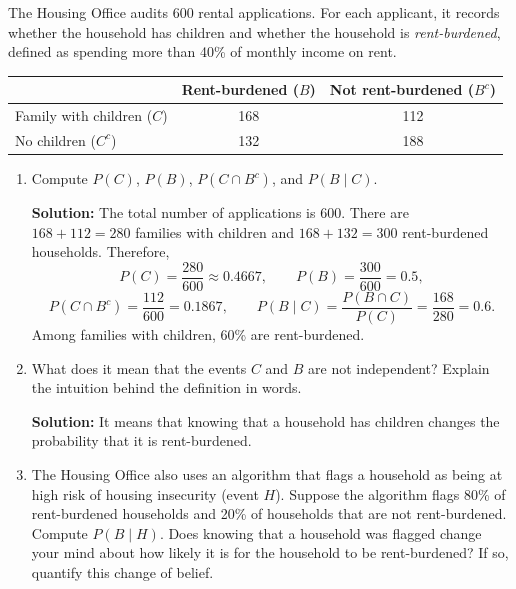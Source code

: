 \documentclass[11pt]{exam}
\begin{document}
\begin{questions}

\newpage
\question[2.5]
The Housing Office audits 600 rental applications. For each applicant, it records whether the household has children and whether the household is \textit{rent-burdened}, defined as spending more than 40\% of monthly income on rent.

\begin{center}
\begin{tabular}{lcc}
\toprule
 & Rent-burdened ($B$) & Not rent-burdened ($B^c$) \\
\midrule
Family with children ($C$) & 168 & 112 \\
No children ($C^c$)       & 132 & 188 \\
\bottomrule
\end{tabular}
\end{center}

\begin{enumerate}[leftmargin = 0.5cm, label = (\alph*), rightmargin = 0.2cm]
    \item Compute $P(C)$, $P(B)$, $P(C\cap B^c)$, and $P(B\mid C)$.

    \begin{solutionorbox}[7.9cm]
    \textbf{Solution:} The total number of applications is 600. There are $168+112=280$ families with children and $168+132=300$ rent-burdened households. Therefore,
    \[
    P(C)=\frac{280}{600}\approx 0.4667, \qquad
    P(B)=\frac{300}{600}=0.5,
    \]
    \[
    P(C\cap B^c)=\frac{112}{600}=0.1867, \qquad
    P(B\mid C)=\frac{P(B\cap C)}{P(C)}=\frac{168}{280}=0.6.
    \]
    Among families with children, 60\% are rent-burdened.
    \end{solutionorbox}

    \item What does it mean that the events $C$ and $B$ are not independent? Explain the intuition behind the definition in words.

    \begin{solutionorbox}[5cm]
    \textbf{Solution:} It means that knowing that a household has children changes the probability that it is rent-burdened.
    \end{solutionorbox}

    \item The Housing Office also uses an algorithm that flags a household as being at high risk of housing insecurity (event $H$). Suppose the algorithm flags 80\% of rent-burdened households and 20\% of households that are not rent-burdened. Compute $P(B\mid H)$.
    Does knowing that a household was flagged change your mind about how likely it is for the household to be rent-burdened? If so, quantify this change of belief.
    \begin{solutionorbox}[4cm]


\end{solutionorbox}
\end{enumerate}
\end{questions}
\end{document}
